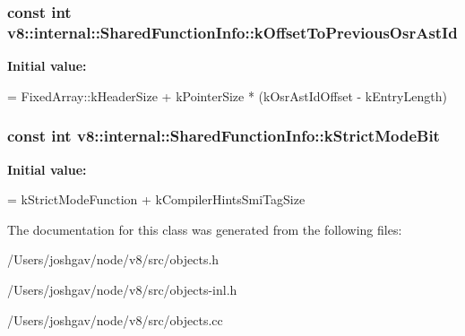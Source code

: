 \subsubsection[{\texorpdfstring{k\+Offset\+To\+Previous\+Osr\+Ast\+Id}{kOffsetToPreviousOsrAstId}}]{\setlength{\rightskip}{0pt plus 5cm}const int v8\+::internal\+::\+Shared\+Function\+Info\+::k\+Offset\+To\+Previous\+Osr\+Ast\+Id\hspace{0.3cm}{\ttfamily [static]}}\hypertarget{classv8_1_1internal_1_1_shared_function_info_a79e851d50650156d3cc1211ec6f84851}{}\label{classv8_1_1internal_1_1_shared_function_info_a79e851d50650156d3cc1211ec6f84851}
{\bfseries Initial value\+:}
\begin{DoxyCode}
=
      FixedArray::kHeaderSize + kPointerSize * (kOsrAstIdOffset - kEntryLength)
\end{DoxyCode}
\subsubsection[{\texorpdfstring{k\+Strict\+Mode\+Bit}{kStrictModeBit}}]{\setlength{\rightskip}{0pt plus 5cm}const int v8\+::internal\+::\+Shared\+Function\+Info\+::k\+Strict\+Mode\+Bit\hspace{0.3cm}{\ttfamily [static]}}\hypertarget{classv8_1_1internal_1_1_shared_function_info_a15fe38551756aac93c12c46a6726fe76}{}\label{classv8_1_1internal_1_1_shared_function_info_a15fe38551756aac93c12c46a6726fe76}
{\bfseries Initial value\+:}
\begin{DoxyCode}
=
      kStrictModeFunction + kCompilerHintsSmiTagSize
\end{DoxyCode}


The documentation for this class was generated from the following files\+:\begin{DoxyCompactItemize}
\item 
/\+Users/joshgav/node/v8/src/objects.\+h\item 
/\+Users/joshgav/node/v8/src/objects-\/inl.\+h\item 
/\+Users/joshgav/node/v8/src/objects.\+cc\end{DoxyCompactItemize}
